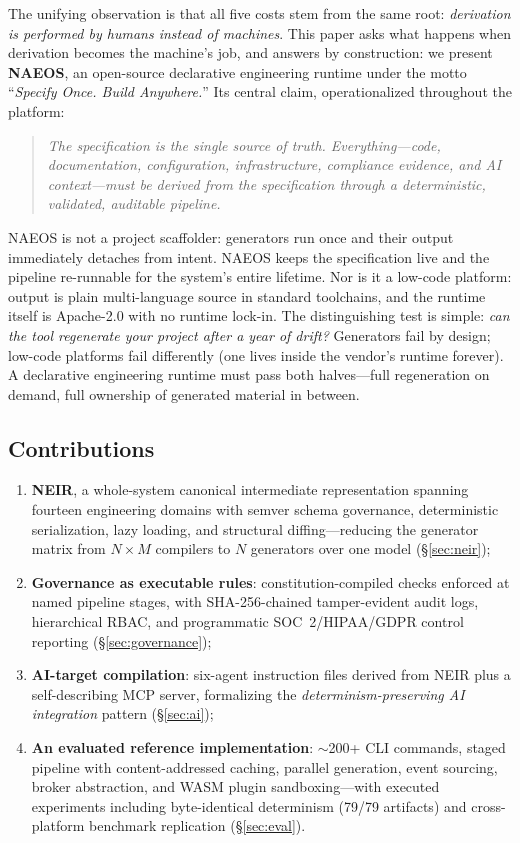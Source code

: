 \documentclass[sigconf,nonacm]{acmart}
\begin{document}
The unifying observation is that all five costs stem from the same root: \emph{derivation is performed by humans instead of machines}. This paper asks what happens when derivation becomes the machine's job, and answers by construction: we present \textbf{NAEOS}, an open-source declarative engineering runtime under the motto ``\emph{Specify Once. Build Anywhere.}'' Its central claim, operationalized throughout the platform:

\begin{quote}\itshape
The specification is the single source of truth. Everything---code, documentation, configuration, infrastructure, compliance evidence, and AI context---must be derived from the specification through a deterministic, validated, auditable pipeline.
\end{quote}

NAEOS is not a project scaffolder: generators run once and their output immediately detaches from intent. NAEOS keeps the specification live and the pipeline re-runnable for the system's entire lifetime. Nor is it a low-code platform: output is plain multi-language source in standard toolchains, and the runtime itself is Apache-2.0 with no runtime lock-in. The distinguishing test is simple: \emph{can the tool regenerate your project after a year of drift?} Generators fail by design; low-code platforms fail differently (one lives inside the vendor's runtime forever). A declarative engineering runtime must pass both halves---full regeneration on demand, full ownership of generated material in between.

\subsection{Contributions}
\begin{enumerate}
  \item \textbf{NEIR}, a whole-system canonical intermediate representation spanning fourteen engineering domains with semver schema governance, deterministic serialization, lazy loading, and structural diffing---reducing the generator matrix from $N{\times}M$ compilers to $N$ generators over one model (\S\ref{sec:neir});
  \item \textbf{Governance as executable rules}: constitution-compiled checks enforced at named pipeline stages, with SHA-256-chained tamper-evident audit logs, hierarchical RBAC, and programmatic SOC~2/HIPAA/GDPR control reporting (\S\ref{sec:governance});
  \item \textbf{AI-target compilation}: six-agent instruction files derived from NEIR plus a self-describing MCP server, formalizing the \emph{determinism-preserving AI integration} pattern (\S\ref{sec:ai});
  \item \textbf{An evaluated reference implementation}: $\sim$200+ CLI commands, staged pipeline with content-addressed caching, parallel generation, event sourcing, broker abstraction, and WASM plugin sandboxing---with executed experiments including byte-identical determinism (79/79 artifacts) and cross-platform benchmark replication (\S\ref{sec:eval}).
\end{enumerate}
\end{document}

